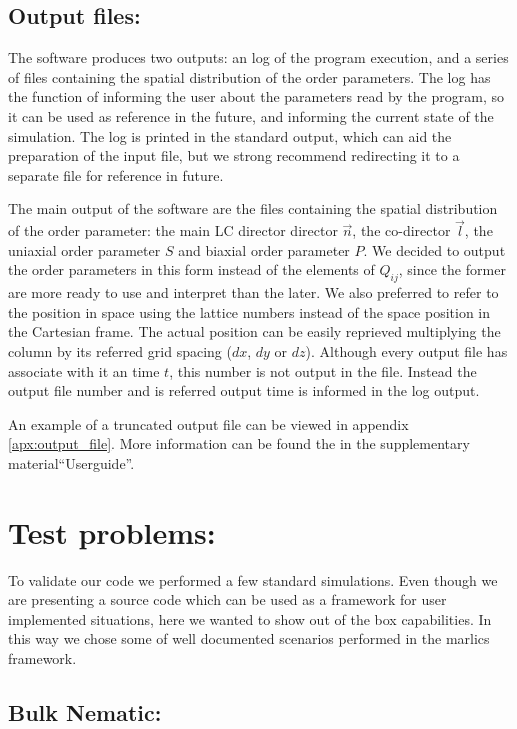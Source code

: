 \documentclass[final,5p,times,twocolumn]{elsarticle}
\begin{document}
\subsection{Output files:}\label{sec:output_files}

The software produces two outputs: an log of the program execution,
and a series of files containing the spatial distribution of the order
parameters. The log has the function of informing the user about the
parameters read by the program, so it can be used as reference in the
future, and informing the current state of the simulation. The log is
printed in the standard output, which can aid the preparation of the
input file, but we strong recommend redirecting it to a separate file
for reference in future.

The main output of the software are the files containing the spatial
distribution of the order parameter: the main LC director director
$\vec{n}$, the co-director $\vec{l}$, the uniaxial order parameter $S$
and biaxial order parameter $P$. We decided to output the order
parameters in this form instead of the elements of $Q_{ij}$, since the
former are more ready to use and interpret than the later.  We also
preferred to refer to the position in space using the lattice numbers
instead of the space position in the Cartesian frame. The actual
position can be easily reprieved multiplying the column by its
referred grid spacing ($dx$, $dy$ or $dz$). Although every output file
has associate with it an time $t$, this number is not output in the
file. Instead the output file number and is referred output time is
informed in the log output. 

An example of a truncated output file
can be viewed in appendix \ref{apx:output_file}.  More information can
be found the in the supplementary material``Userguide''.

\section{Test problems:}\label{sec:testing_marlics}

To validate our code we performed a few standard simulations. Even
though we are presenting a source code which can be used as a
framework for user implemented situations, here we wanted to show out
of the box capabilities. In this way we chose some of well documented
scenarios performed in the marlics framework.


\subsection{Bulk Nematic:}
\end{document}
